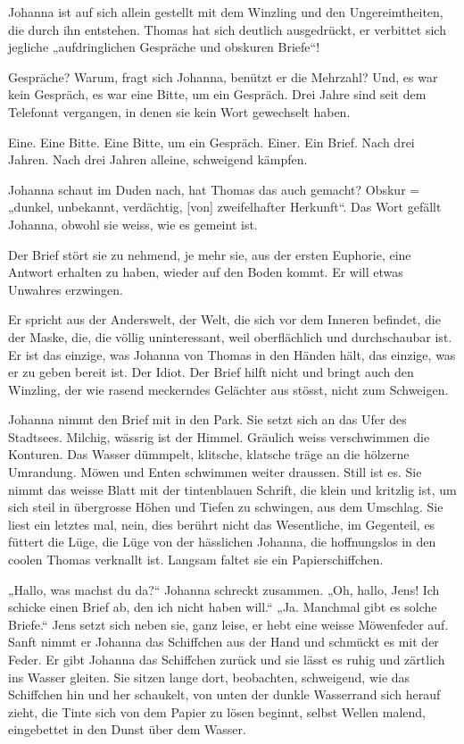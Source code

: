 \documentclass[10pt,titlepage,a5paper]{book}
\begin{document}
Johanna ist auf sich allein gestellt mit dem Winzling und den Ungereimtheiten, die durch ihn entstehen. Thomas hat sich deutlich ausgedrückt, er verbittet sich jegliche „aufdringlichen Gespräche und obskuren Briefe“! 

Gespräche? Warum, fragt sich Johanna, benützt er die Mehrzahl? Und, es war kein Gespräch, es war eine Bitte, um ein Gespräch. Drei Jahre sind seit dem Telefonat vergangen, in denen sie kein Wort gewechselt haben. 

Eine. Eine Bitte. Eine Bitte, um ein Gespräch. Einer. Ein Brief. Nach drei Jahren. Nach drei Jahren alleine, schweigend kämpfen.

Johanna schaut im Duden nach, hat Thomas das auch gemacht? Obskur =  „dunkel, unbekannt, verdächtig, [von] zweifelhafter Herkunft“. Das Wort gefällt Johanna, obwohl sie weiss, wie es gemeint ist.

Der Brief stört sie zu nehmend, je mehr sie, aus der ersten Euphorie, eine Antwort erhalten zu haben, wieder auf den Boden kommt. Er will etwas Unwahres erzwingen. 

Er spricht aus der Anderswelt, der Welt, die sich vor dem Inneren befindet, die der Maske, die, die völlig uninteressant, weil oberflächlich und durchschaubar ist. Er ist das einzige, was Johanna von Thomas in den Händen hält, das einzige, was er zu geben bereit ist. Der Idiot. Der Brief hilft nicht und bringt auch den Winzling, der wie rasend meckerndes Gelächter aus stösst, nicht zum Schweigen.

Johanna nimmt den Brief mit in den Park. Sie setzt sich an das Ufer des Stadtsees. Milchig, wässrig ist der Himmel. Gräulich weiss verschwimmen die Konturen. Das Wasser dümmpelt, klitsche, klatsche träge an die hölzerne Umrandung. Möwen und Enten schwimmen weiter draussen. Still ist es. Sie nimmt das weisse Blatt mit der tintenblauen Schrift, die klein und kritzlig ist, um sich steil in übergrosse Höhen und Tiefen zu schwingen, aus dem Umschlag. Sie liest ein letztes mal, nein, dies berührt nicht das Wesentliche, im Gegenteil, es füttert die Lüge, die Lüge von der hässlichen Johanna, die hoffnungslos in den coolen Thomas verknallt ist. Langsam faltet sie ein Papierschiffchen. 

„Hallo, was machst du da?“ Johanna schreckt zusammen. „Oh, hallo, Jens! Ich schicke einen Brief ab, den ich nicht haben will.“ „Ja. Manchmal gibt es solche Briefe.“ Jens setzt sich neben sie, ganz leise, er hebt eine weisse Möwenfeder auf. Sanft nimmt er Johanna das Schiffchen aus der Hand und schmückt es mit der Feder. Er gibt Johanna das Schiffchen zurück und sie lässt es ruhig und zärtlich ins Wasser gleiten. Sie sitzen lange dort, beobachten, schweigend, wie das Schiffchen hin und her schaukelt, von unten der dunkle Wasserrand sich herauf zieht, die Tinte sich von dem Papier zu lösen beginnt, selbst Wellen malend, eingebettet in den Dunst über dem Wasser.
\end{document}
